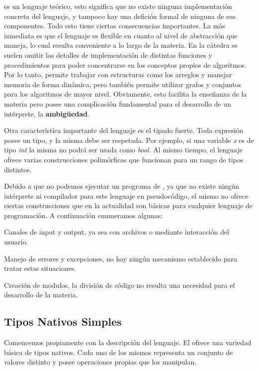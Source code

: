 \documentclass{article}
\begin{document}
\Lang\space es un lenguaje teórico, esto significa que no existe ninguna implementación concreta del lenguaje, y tampoco hay una defición formal de ninguna de sus componentes.
Todo esto tiene ciertas consecuencias importantes.
La más inmediata es que el lenguaje es flexible en cuanto al nivel de abstracción que maneja, lo cual resulta conveniente a lo largo de la materia.
En la cátedra se suelen omitir los detalles de implementación de distintas funciones y procedimientos para poder concentrarse en los conceptos propios de algoritmos.
Por lo tanto, \Lang\space permite trabajar con estructuras como los arreglos y manejar memoria de forma dinámica, pero también permite utilizar grafos y conjuntos para los algoritmos de mayor nivel.
Obviamente, esto facilita la enseñanza de la materia pero posee una complicación fundamental para el desarrollo de un intérprete, la \textbf{ambigüedad}.

Otra característica importante del lenguaje es el tipado fuerte.
Toda expresión posee un tipo, y la misma debe ser respetada.
Por ejemplo, si una variable \textit{x} es de tipo \textit{int} la misma no podrá ser usada como \textit{bool}.
Al mismo tiempo, el lenguaje ofrece varias construcciones polimórficas que funcionan para un rango de tipos distintos.

Debido a que no podemos ejecutar un programa de \Lang, ya que no existe ningún intérprete ni compilador para este lenguaje en pseudocódigo, el mismo no ofrece ciertas construcciones que en la actualidad son básicas para cualquier lenguaje de programación.
A continuación enumeramos algunas:
\begin{enumerate*}
\item Canales de input y output, ya sea con archivos o mediante interacción del usuario.
\item Manejo de errores y excepciones, no hay ningún mecanismo establecido para tratar estas situaciones.
\item Creación de modulos, la división de código no resulta una necesidad para el desarrollo de la materia.
\end{enumerate*}

\subsection{Tipos Nativos Simples}

Comencemos propiamente con la descripción del lenguaje.
El \Lang\space ofrece una variedad básica de tipos nativos.
Cada uno de los mismos representa un conjunto de valores distinto y posee operaciones propias que los manipulan.
\end{document}

